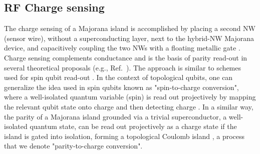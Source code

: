 \subsection{RF Charge sensing}
The charge sensing of a Majorana island is accomplished by placing a second NW (sensor wire), without a superconducting layer, next to the hybrid-NW Majorana device, and capacitively coupling the two NWs with a floating metallic gate \cite{charge_sensing1}. Charge sensing complements conductance and is the basis of parity read-out in several theoretical proposals (e.g., Ref.~\cite{AasenPRX16}). The approach is similar to schemes used for spin qubit read-out \cite{floatinggate,PhysRevApplied.4.014018,charge_sensing2}. In the context of topological qubits, one can generalize the idea used in spin qubits known as "spin-to-charge conversion", where a well-isolated quantum variable (spin) is read out projectively by mapping the relevant qubit state onto charge and then detecting charge \cite{petta,RevModPhys.79.1217}. In a similar way, the parity of a Majorana island grounded via a trivial superconductor, a well-isolated quantum state, can be read out projectively as a charge state if the island is gated into isolation, forming a topological Coulomb island \cite{AasenPRX16}, a process that we denote "parity-to-charge conversion".

